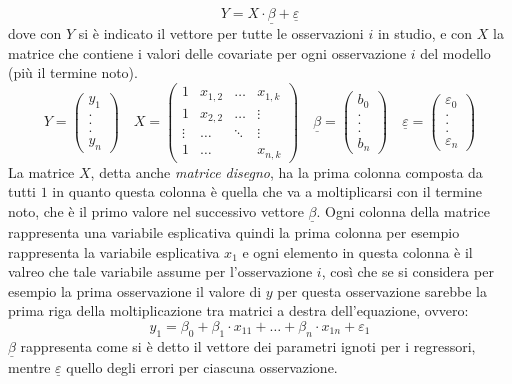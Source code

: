 \begin{equation}
Y = X \cdot \underline{\beta} + \underline{\varepsilon}
\end{equation}
dove con $Y$ si è indicato il vettore per tutte le osservazioni $i$ in studio, e con $X$ la matrice che contiene i valori delle covariate per ogni osservazione $i$ del modello (più il termine noto).
\begin{equation}
Y = 
\begin{pmatrix}
y_1 \\ 
. \\ 
. \\ 
. \\ 
y_n
\end{pmatrix}
\quad
X = \begin{pmatrix}
1 & x_{1,2} & \dots & x_{1,k} \\ 
1 & x_{2,2} & \dots & \vdots \\ 
\vdots & \dots  & \ddots & \vdots \\ 
1 & \dots &  & x_{n,k}
\end{pmatrix} 
\quad
\underline{\beta} = \begin{pmatrix}
b_0 \\ 
. \\ 
. \\ 
. \\ 
b_n
\end{pmatrix} 
\quad
\underline{\varepsilon} = \begin{pmatrix}
\varepsilon_0 \\ 
. \\ 
. \\ 
. \\ 
\varepsilon_n
\end{pmatrix} 
\end{equation}
La matrice $X$, detta anche \textit{matrice disegno}, ha la prima colonna composta da tutti $1$ in quanto questa colonna è quella che va a moltiplicarsi con il termine noto, che è il primo valore nel successivo vettore $\underline{\beta}$. Ogni colonna della matrice rappresenta una variabile esplicativa quindi la prima colonna per esempio rappresenta la variabile esplicativa $x_1$ e ogni elemento in questa colonna è il valreo che tale variabile assume per l'osservazione $i$, così che se si considera per esempio la prima osservazione il valore di $y$ per questa osservazione sarebbe la prima riga della moltiplicazione tra matrici a destra dell'equazione, ovvero:
\begin{equation}
	y_1 = \beta_0 + \beta_1 \cdot x_{11} + \dots + \beta_n \cdot x_{1n} + \varepsilon_1
\end{equation}
$\underline{\beta}$ rappresenta come si è detto il vettore dei parametri ignoti per i regressori, mentre $\underline{\varepsilon}$ quello degli errori per ciascuna osservazione.

